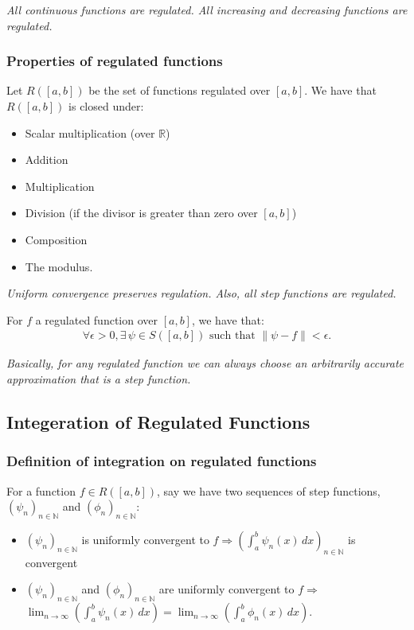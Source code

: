 \documentclass[a4paper, 12pt, twoside]{article}
\begin{document}
\textit{All continuous functions are regulated. All increasing and
      decreasing functions are regulated.}

\subsubsection{Properties of regulated functions}

Let $R([a, b])$ be the set of functions regulated over $[a, b]$. We have that
$R([a, b])$ is closed under:

\begin{itemize}
      \item Scalar multiplication (over $\mathbb{R}$)
      \item Addition
      \item Multiplication
      \item Division (if the divisor is greater than zero over $[a, b]$)
      \item Composition
      \item The modulus.
\end{itemize}

\textit{Uniform convergence preserves regulation. Also, all step functions are
      regulated.}

\newpage

For $f$ a regulated function over $[a,b]$, we have that:
\begin{align*}
      \forall \epsilon > 0,\exists\,\psi\in S([a, b]) \text{ such that }
      \|\psi - f\| < \epsilon.
\end{align*}

\textit{Basically, for any regulated function we can always choose an
      arbitrarily accurate approximation that is a step function.}

\subsection{Integeration of Regulated Functions}

\subsubsection{Definition of integration on regulated functions}

For a function $f \in R([a, b])$, say we have two sequences of step
functions, $(\psi_n)_{n\in\mathbb{N}}$ and $(\phi_n)_{n\in\mathbb{N}}$:

\begin{itemize}
      \item $(\psi_n)_{n\in\mathbb{N}}$ is uniformly convergent to $f
                  \Rightarrow (\int_a^b\psi_n(x)\,dx)_{n\in\mathbb{N}}$ is
            convergent
      \item $(\psi_n)_{n\in\mathbb{N}}$ and $(\phi_n)_{n\in\mathbb{N}}$
            are uniformly convergent to $f \Rightarrow$ \\
            $\lim_{n\to\infty}(\int_a^b\psi_n(x)\,dx)
                  = \lim_{n\to\infty}(\int_a^b\phi_n(x)\,dx)$.
\end{itemize}
\end{document}

